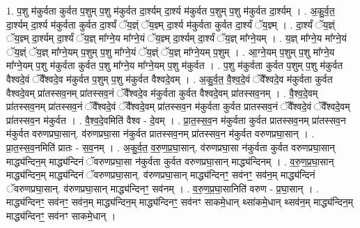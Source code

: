 \documentclass[17pt]{extarticle}
\begin{document}
1. प॒शु म॑कुर्वता कुर्वत प॒शुम् प॒शु म॑कुर्वत दा॒र्श्यम् दा॒र्श्य म॑कुर्वत प॒शुम् प॒शु म॑कुर्वत दा॒र्श्यम् । . अ॒कु॒र्व॒त॒ दा॒र्श्यम् दा॒र्श्य म॑कुर्वता कुर्वत दा॒र्श्यं ॅय॒ज्ञ्ं ॅय॒ज्ञ्म् दा॒र्श्य म॑कुर्वता कुर्वत दा॒र्श्यं ॅय॒ज्ञ्म् । . दा॒र्श्यं ॅय॒ज्ञ्ं ॅय॒ज्ञ्म् दा॒र्श्यम् दा॒र्श्यं ॅय॒ज्ञ् मा᳚ग्ने॒य मा᳚ग्ने॒यं ॅय॒ज्ञ्म् दा॒र्श्यम् दा॒र्श्यं ॅय॒ज्ञ् मा᳚ग्ने॒यम् । . य॒ज्ञ् मा᳚ग्ने॒य मा᳚ग्ने॒यं ॅय॒ज्ञ्ं ॅय॒ज्ञ् मा᳚ग्ने॒यम् प॒शुम् प॒शु मा᳚ग्ने॒यं ॅय॒ज्ञ्ं ॅय॒ज्ञ् मा᳚ग्ने॒यम् प॒शुम् । . आ॒ग्ने॒यम् प॒शुम् प॒शु मा᳚ग्ने॒य मा᳚ग्ने॒यम् प॒शु म॑कुर्वता कुर्वत प॒शु मा᳚ग्ने॒य मा᳚ग्ने॒यम् प॒शु म॑कुर्वत । . प॒शु म॑कुर्वता कुर्वत प॒शुम् प॒शु म॑कुर्वत वैश्वदे॒वं ॅवै᳚श्वदे॒व म॑कुर्वत प॒शुम् प॒शु म॑कुर्वत वैश्वदे॒वम् । . अ॒कु॒र्व॒त॒ वै॒श्व॒दे॒वं ॅवै᳚श्वदे॒व म॑कुर्वता कुर्वत वैश्वदे॒वम् प्रा॑तस्सव॒नम् प्रा॑तस्सव॒नं ॅवै᳚श्वदे॒व म॑कुर्वता कुर्वत वैश्वदे॒वम् प्रा॑तस्सव॒नम् । . वै॒श्व॒दे॒वम् प्रा॑तस्सव॒नम् प्रा॑तस्सव॒नं ॅवै᳚श्वदे॒वं ॅवै᳚श्वदे॒वम् प्रा॑तस्सव॒न म॑कुर्वता कुर्वत प्रातस्सव॒नं ॅवै᳚श्वदे॒वं ॅवै᳚श्वदे॒वम् प्रा॑तस्सव॒न म॑कुर्वत । . वै॒श्व॒दे॒वमिति॑ वैश्व - दे॒वम् । . प्रा॒त॒स्स॒व॒न म॑कुर्वता कुर्वत प्रातस्सव॒नम् प्रा॑तस्सव॒न म॑कुर्वत वरुणप्रघा॒सान्. व॑रुणप्रघा॒सा न॑कुर्वत प्रातस्सव॒नम् प्रा॑तस्सव॒न म॑कुर्वत वरुणप्रघा॒सान् । . प्रा॒त॒स्स॒व॒नमिति॑ प्रातः - स॒व॒नम् । . अ॒कु॒र्व॒त॒ व॒रु॒ण॒प्र॒घा॒सान्. व॑रुणप्रघा॒सा न॑कुर्वता कुर्वत वरुणप्रघा॒सान् माद्ध्य॑न्दिन॒म् माद्ध्य॑न्दिनं ॅवरुणप्रघा॒सा न॑कुर्वता कुर्वत वरुणप्रघा॒सान् माद्ध्य॑न्दिनम् । . व॒रु॒ण॒प्र॒घा॒सान् माद्ध्य॑न्दिन॒म् माद्ध्य॑न्दिनं ॅवरुणप्रघा॒सान्. व॑रुणप्रघा॒सान् माद्ध्य॑न्दिनꣳ॒॒ सव॑नꣳ॒॒ सव॑न॒म् माद्ध्य॑न्दिनं ॅवरुणप्रघा॒सान्. व॑रुणप्रघा॒सान् माद्ध्य॑न्दिनꣳ॒॒ सव॑नम् । . व॒रु॒ण॒प्र॒घा॒सानिति॑ वरुण - प्र॒घा॒सान् । . माद्ध्य॑न्दिनꣳ॒॒ सव॑नꣳ॒॒ सव॑न॒म् माद्ध्य॑न्दिन॒म् माद्ध्य॑न्दिनꣳ॒॒ सव॑नꣳ साकमे॒धान् थ्सा॑कमे॒धान् थ्सव॑न॒म् माद्ध्य॑न्दिन॒म् माद्ध्य॑न्दिनꣳ॒॒ सव॑नꣳ साकमे॒धान् । \newline
\end{document}
